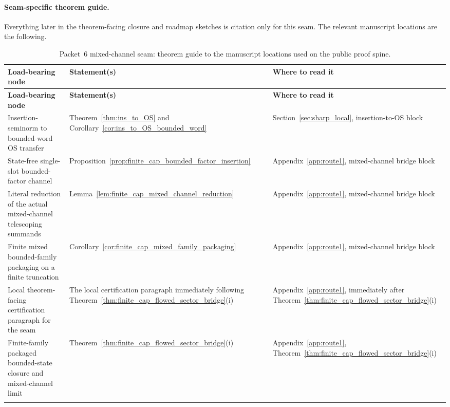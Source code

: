 \paragraph{Seam-specific theorem guide.}
Everything later in the theorem-facing closure and roadmap sketches is citation only for this seam.
The relevant manuscript locations are the following.

\begingroup
\footnotesize
\setlength{\tabcolsep}{4pt}
\begin{longtable}{@{}
>{\RaggedRight\arraybackslash}p{}
>{\RaggedRight\arraybackslash}p{}
>{\RaggedRight\arraybackslash}p{}@{}}
\toprule
\textbf{Load-bearing node} & \textbf{Statement(s)} & \textbf{Where to read it}\\
\midrule
\endfirsthead
\toprule
\textbf{Load-bearing node} & \textbf{Statement(s)} & \textbf{Where to read it}\\
\midrule
\endhead
Insertion-seminorm to bounded-word OS transfer & Theorem~\ref{thm:ins_to_OS} and Corollary~\ref{cor:ins_to_OS_bounded_word} & Section~\ref{sec:sharp_local}, insertion-to-OS block\\[0.35em]

State-free single-slot bounded-factor channel & Proposition~\ref{prop:finite_cap_bounded_factor_insertion} & Appendix~\ref{app:route1}, mixed-channel bridge block\\[0.35em]

Literal reduction of the actual mixed-channel telescoping summands & Lemma~\ref{lem:finite_cap_mixed_channel_reduction} & Appendix~\ref{app:route1}, mixed-channel bridge block\\[0.35em]

Finite mixed bounded-family packaging on a finite truncation & Corollary~\ref{cor:finite_cap_mixed_family_packaging} & Appendix~\ref{app:route1}, mixed-channel bridge block\\[0.35em]

Local theorem-facing certification paragraph for the seam & The local certification paragraph immediately following Theorem~\ref{thm:finite_cap_flowed_sector_bridge}(i) & Appendix~\ref{app:route1}, immediately after Theorem~\ref{thm:finite_cap_flowed_sector_bridge}(i)\\[0.35em]

Finite-family packaged bounded-state closure and mixed-channel limit & Theorem~\ref{thm:finite_cap_flowed_sector_bridge}(i) & Appendix~\ref{app:route1}, Theorem~\ref{thm:finite_cap_flowed_sector_bridge}(i)\\
\bottomrule
\caption{Packet~6 mixed-channel seam: theorem guide to the manuscript locations used on the public proof spine.}\label{tab:packet6_seam_file_map}
\end{longtable}
\endgroup

